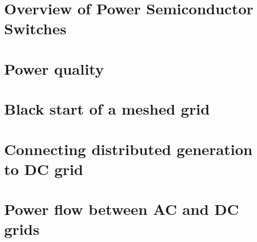 \documentclass{report}
\begin{document}
\chapter{Overview of Power Semiconductor Switches}


\chapter{Power quality}


\chapter{Black start of a meshed grid}


\chapter{Connecting distributed generation to DC grid}

\chapter{Power flow between AC and DC grids}



 
 
\end{document}
